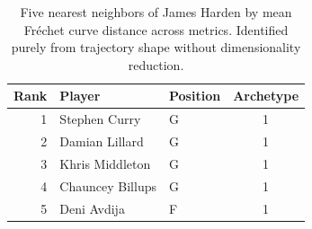 \begin{table}[htbp]
  \centering\small
  \begin{tabular}{rllc}
    \toprule
    Rank & Player & Position & Archetype \\
    \midrule
    1 & Stephen Curry & G & 1 \\
    2 & Damian Lillard & G & 1 \\
    3 & Khris Middleton & G & 1 \\
    4 & Chauncey Billups & G & 1 \\
    5 & Deni Avdija & F & 1 \\
    \bottomrule
  \end{tabular}
  \caption{Five nearest neighbors of James Harden by mean Fr\'{e}chet curve distance across metrics. Identified purely from trajectory shape without dimensionality reduction.}
  \label{tab:James_Harden_frechet_curve_neighbors}
\end{table}


